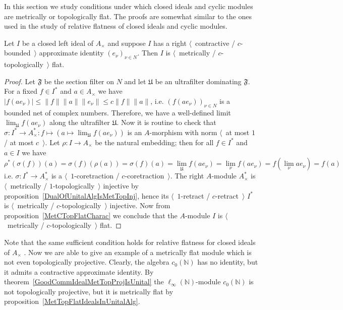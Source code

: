 In this section we study conditions under which closed ideals and cyclic modules are
metrically or topologically flat. The proofs are somewhat similar to the ones used
in the study of relative flatness of closed ideals and cyclic modules.

\begin{proposition}\label{MetTopFlatIdealsInUnitalAlg} Let $I$ be a closed left ideal
of $A_\times $ and suppose $I$ has a right $\langle$~contractive / $c$-bounded~$\rangle$
approximate identity ${(e_\nu)}_{\nu\in N}$. Then $I$ is $\langle$~metrically /
$c$-topologically~$\rangle$ flat.
\end{proposition}
\begin{proof} Let $\mathfrak{F}$ be the section filter on $N$ and let
$\mathfrak{U}$ be an ultrafilter dominating $\mathfrak{F}$. 
For a fixed $f\in I^*$ 
and $a\in A_\times $ we have 
$|f(a e_\nu)|
\leq\lVert f\rVert\lVert a\rVert\lVert e_\nu\rVert
\leq c\lVert f\rVert\lVert a\rVert$, 
i.e. ${(f(ae_\nu))}_{\nu\in N}$ is a bounded net of complex numbers. 
Therefore, we have a well-defined limit $\lim_{\mathfrak{U}}f(ae_\nu)$ along 
the ultrafilter $\mathfrak{U}$. Now it is routine to check that 
$\sigma:I^*\to A_\times^*:f\mapsto (a\mapsto \lim_{\mathfrak{U}}f(ae_\nu))$ 
is an $A$-morphism with norm $\langle$~at most $1$ / at most $c$~$\rangle$. 
Let $\rho:I\to A_\times$ be the natural embedding; then for 
all $f\in I^*$ and $a\in I$ we have
\[
\rho^*(\sigma(f))(a)
=\sigma(f)(\rho(a))
=\sigma(f)(a)
=\lim_{\mathfrak{U}}f(a e_\nu)
=\lim_{\nu}f(a e_\nu)
=f(\lim_{\nu}a e_\nu)
=f(a)
\]
i.e. $\sigma:I^*\to A_\times^*$ is a $\langle$~$1$-coretraction /
$c$-coretraction~$\rangle$. The right $A$-module $A_\times ^*$ is
$\langle$~metrically / $1$-topologically~$\rangle$ injective by
proposition~\ref{DualOfUnitalAlgIsMetTopInj}, hence its $\langle$~$1$-retract /
$c$-retract~$\rangle$ $I^*$ is $\langle$~metrically /
$c$-topologically~$\rangle$ injective. Now from 
proposition~\ref{MetCTopFlatCharac} we conclude that the $A$-module $I$ 
is $\langle$~metrically / $c$-topologically~$\rangle$ flat.
\end{proof}

Note that the same sufficient condition holds for relative flatness for closed ideals
of $A_\times$ \cite[proposition 7.1.45]{HelBanLocConvAlg}. Now we are able to
give an example of a metrically flat module which is not even topologically
projective. Clearly, the algebra $c_0(\mathbb{N})$ has no identity, but it admits a
contractive approximate identity. By
theorem~\ref{GoodCommIdealMetTopProjIsUnital} the $\ell_\infty(\mathbb{N})$-module
$c_0(\mathbb{N})$ is not topologically
projective, but it is metrically flat by
proposition~\ref{MetTopFlatIdealsInUnitalAlg}.

